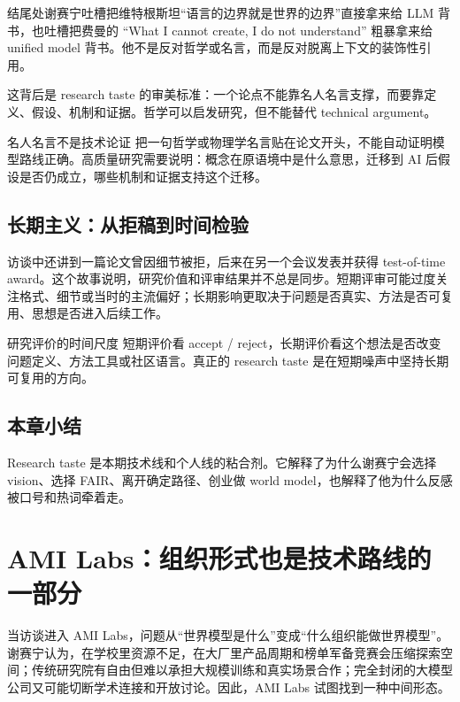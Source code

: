 \documentclass[a4paper]{article}
\begin{document}
结尾处谢赛宁吐槽把维特根斯坦“语言的边界就是世界的边界”直接拿来给 LLM 背书，也吐槽把费曼的 “What I cannot create, I do not understand” 粗暴拿来给 unified model 背书。他不是反对哲学或名言，而是反对脱离上下文的装饰性引用。

这背后是 research taste 的审美标准：一个论点不能靠名人名言支撑，而要靠定义、假设、机制和证据。哲学可以启发研究，但不能替代 technical argument。

\begin{warningbox}{名人名言不是技术论证}
把一句哲学或物理学名言贴在论文开头，不能自动证明模型路线正确。高质量研究需要说明：概念在原语境中是什么意思，迁移到 AI 后假设是否仍成立，哪些机制和证据支持这个迁移。
\end{warningbox}

\subsection{长期主义：从拒稿到时间检验}

访谈中还讲到一篇论文曾因细节被拒，后来在另一个会议发表并获得 test-of-time award。这个故事说明，研究价值和评审结果并不总是同步。短期评审可能过度关注格式、细节或当时的主流偏好；长期影响更取决于问题是否真实、方法是否可复用、思想是否进入后续工作。

\begin{importantbox}{研究评价的时间尺度}
短期评价看 accept / reject，长期评价看这个想法是否改变问题定义、方法工具或社区语言。真正的 research taste 是在短期噪声中坚持长期可复用的方向。
\end{importantbox}

\subsection{本章小结}

Research taste 是本期技术线和个人线的粘合剂。它解释了为什么谢赛宁会选择 vision、选择 FAIR、离开确定路径、创业做 world model，也解释了他为什么反感被口号和热词牵着走。

\section{AMI Labs：组织形式也是技术路线的一部分}

当访谈进入 AMI Labs，问题从“世界模型是什么”变成“什么组织能做世界模型”。谢赛宁认为，在学校里资源不足，在大厂里产品周期和榜单军备竞赛会压缩探索空间；传统研究院有自由但难以承担大规模训练和真实场景合作；完全封闭的大模型公司又可能切断学术连接和开放讨论。因此，AMI Labs 试图找到一种中间形态。
\end{document}
